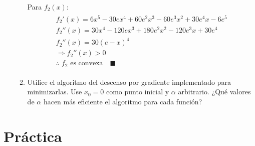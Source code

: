 \documentclass[10pt,letterpaper]{article}
\begin{document}
\begin{enumerate}
\begin{enumerate}
                    Para $f_2(x)$:
                    \begin{equation*} \begin{split} \begin{gathered}
                        f_2'(x) =  6 x^5  - 30 e x^4  + 60 e^2 x^3  - 60 e^3 x^2 + 30 e^4 x - 6 e^5  \\
                        f_2''(x) = 30 x^4 - 120 e x^3 + 180 e^2 x^2 - 120 e^3 x  + 30 e^4 \\
                        f_2''(x) = 30(e - x)^4 \\
                        \Rightarrow f_2''(x) > 0 \\
                        \therefore \; f_2 \text{ es convexa} \quad \blacksquare
                    \end{gathered} \end{split} \end{equation*}

                \item Utilice el algoritmo del descenso por gradiente implementado
                para minimizarlas. Use $x_0 = 0$ como punto inicial y $\alpha$
                arbitrario. ¿Qué valores de $\alpha$ hacen más eficiente el algoritmo
                para cada función?
            \end{enumerate}
    \end{enumerate}

\section{Práctica}
\end{document}
